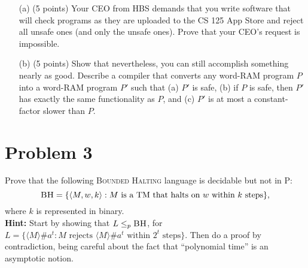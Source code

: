 \documentclass[12pt]{article}
\newcommand{\PTIME}{\mathrm{P}}
\newcommand{\textprob}[1]{\textsc{#1}}
\newcommand{\mathprob}[1]{\mbox{\textmd{\textsc{#1}}}}
\begin{document}
\begin{itemize}
\item[(a)] (5 points) Your CEO from HBS demands that you write software that will check programs as they are uploaded to the CS 125 App Store and reject all unsafe ones (and only the unsafe ones).  Prove that your CEO's request is impossible.

\item[(b)] (5 points) Show that nevertheless, you can still accomplish something nearly as good.  Describe a compiler that converts any word-RAM program $P$ into
a word-RAM program $P'$ such that (a) $P'$ is safe, (b) if $P$ is safe, then $P'$ has exactly the same functionality as $P$, and (c) $P'$
is at most a constant-factor slower than $P$.
\end{itemize}

\section*{Problem 3}

Prove that the following \textprob{Bounded Halting} language is decidable but not in $\PTIME$:
$$\mathprob{BH} = \{ \langle M,w,k\rangle : \mbox{$M$ is a TM that halts on $w$ within $k$ steps}\},$$ where $k$ is represented in binary.\\ \textbf{Hint:}
Start by showing that $L\leq_p \mathprob{BH}$, for $L=\{ \langle M\rangle \# a^t : \mbox{$M$ rejects $\langle M\rangle \# a^t$ within $2^t$ steps}\}$.  Then
do a proof by contradiction, being careful about the fact that ``polynomial time'' is an asymptotic notion.
\end{document}
